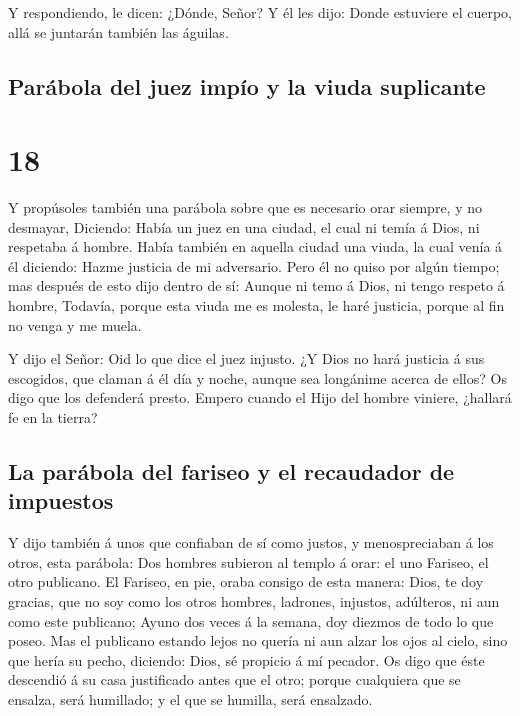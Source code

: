  Y respondiendo, le dicen: ¿Dónde, Señor? Y él les dijo:
Donde estuviere el cuerpo, allá se juntarán también las águilas.

\hypertarget{paruxe1bola-del-juez-impuxedo-y-la-viuda-suplicante}{%
\subsection{Parábola del juez impío y la viuda
suplicante}\label{paruxe1bola-del-juez-impuxedo-y-la-viuda-suplicante}}

\hypertarget{section-17}{%
\section{18}\label{section-17}}

 Y propúsoles también una parábola sobre que es necesario
orar siempre, y no desmayar,  Diciendo: Había un juez en
una ciudad, el cual ni temía á Dios, ni respetaba á hombre.
 Había también en aquella ciudad una viuda, la cual venía
á él diciendo: Hazme justicia de mi adversario.  Pero él
no quiso por algún tiempo; mas después de esto dijo dentro de sí: Aunque
ni temo á Dios, ni tengo respeto á hombre,  Todavía,
porque esta viuda me es molesta, le haré justicia, porque al fin no
venga y me muela.

 Y dijo el Señor: Oid lo que dice el juez injusto.
 ¿Y Dios no hará justicia á sus escogidos, que claman á él
día y noche, aunque sea longánime acerca de ellos?  Os
digo que los defenderá presto. Empero cuando el Hijo del hombre viniere,
¿hallará fe en la tierra?

\hypertarget{la-paruxe1bola-del-fariseo-y-el-recaudador-de-impuestos}{%
\subsection{La parábola del fariseo y el recaudador de
impuestos}\label{la-paruxe1bola-del-fariseo-y-el-recaudador-de-impuestos}}

 Y dijo también á unos que confiaban de sí como justos, y
menospreciaban á los otros, esta parábola:  Dos hombres
subieron al templo á orar: el uno Fariseo, el otro publicano.
 El Fariseo, en pie, oraba consigo de esta manera: Dios,
te doy gracias, que no soy como los otros hombres, ladrones, injustos,
adúlteros, ni aun como este publicano;  Ayuno dos veces á
la semana, doy diezmos de todo lo que poseo.  Mas el
publicano estando lejos no quería ni aun alzar los ojos al cielo, sino
que hería su pecho, diciendo: Dios, sé propicio á mí pecador.
 Os digo que éste descendió á su casa justificado antes
que el otro; porque cualquiera que se ensalza, será humillado; y el que
se humilla, será ensalzado.


